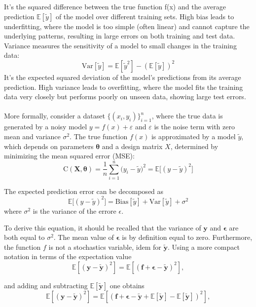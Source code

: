 \documentclass[%
 reprint,            %
 amsmath,amssymb,
 aps,
]{revtex4-2}
\begin{document}
It's the squared difference between the true function f(x) and the average prediction $\mathbb{E}[\tilde y]$ of the model over different training sets. High bias leads to underfitting, where the model is too simple (often linear) and cannot capture the underlying patterns, resulting in large errors on both training and test data.
\\Variance measures the sensitivity of a model to small changes in the training data:
$$
\mathrm{Var}[\tilde y] = \mathbb{E}[\tilde y^2] - (\mathbb{E}[\tilde y])^2
$$
It's the expected squared deviation of the model's predictions from its average prediction.
High variance leads to overfitting, where the model fits the training data very closely but performs poorly on unseen data, showing large test errors.\\\\
More formally, consider a dataset $\{(x_i, y_i)\}_{i=1}^n$, where the true data is generated by a noisy model $y = f(x) + \varepsilon$ and $\varepsilon$ is the noise term with zero mean and variance $\sigma^2$. 
The true function $f(x)$ is approximated by a model $\tilde y$, which depends on parameters $\boldsymbol{\theta}$ and a design matrix $X$, determined by minimizing the mean squared error (MSE):
$$
\text{C}(\boldsymbol{X, \theta}) = \frac{1}{n} \sum_{i=1}^n \big( y_i - \tilde y \big)^2= \mathbb{E}\big[(y - \tilde y)^2\big]
$$

The expected prediction error can be decomposed as
$$\mathbb{E}[(y - \tilde y)^2\big] = \mathrm{Bias}[\tilde y] + \mathrm{Var}[\tilde y] + \sigma^2$$
where $\sigma ^2$ is the variance of the errore $\epsilon$. 

To derive this equation, it should be recalled that the variance of $\boldsymbol{y}$ and $\boldsymbol{\epsilon}$ are both equal to $\sigma^2$. The mean value of $\boldsymbol{\epsilon}$ is by definition equal to zero. Furthermore, the function $f$ is not a stochastics variable, idem for $\boldsymbol{\tilde{y}}$.
Using a more compact notation in terms of the expectation value
$$
\mathbb{E}\left[(\boldsymbol{y}-\boldsymbol{\tilde{y}})^2\right]=\mathbb{E}\left[(\boldsymbol{f}+\boldsymbol{\epsilon}-\boldsymbol{\tilde{y}})^2\right],
$$

and adding and subtracting $\mathbb{E}\left[\boldsymbol{\tilde{y}}\right]$ one obtains 
$$
\mathbb{E}\left[(\boldsymbol{y}-\boldsymbol{\tilde{y}})^2\right]=\mathbb{E}\left[(\boldsymbol{f}+\boldsymbol{\epsilon}-\boldsymbol{\tilde{y}}+\mathbb{E}\left[\boldsymbol{\tilde{y}}\right]-\mathbb{E}\left[\boldsymbol{\tilde{y}}\right])^2\right],
$$
\end{document}
